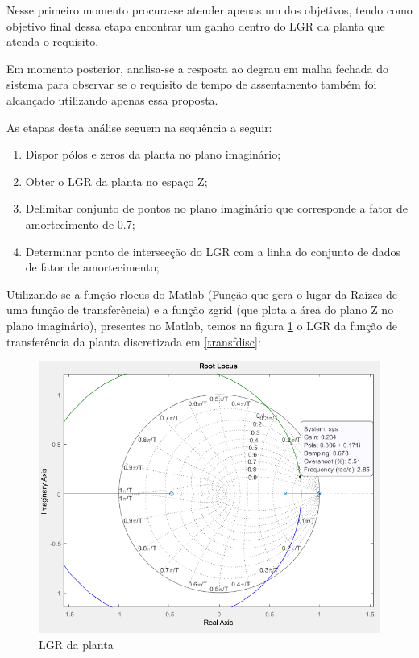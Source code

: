 \documentclass[a4paper,11pt]{article}
\begin{document}
Nesse primeiro momento procura-se atender apenas um dos objetivos, tendo como objetivo final dessa etapa encontrar um ganho dentro do LGR da planta que atenda o requisito. 

Em momento posterior, analisa-se a resposta ao degrau em malha fechada do sistema para observar se o requisito de tempo de assentamento também foi alcançado utilizando apenas essa proposta. 

As etapas desta análise seguem na sequência a seguir:

\begin{enumerate}
   \item Dispor pólos e zeros da planta no plano imaginário;
   \item Obter o LGR da planta no espaço Z;
   \item Delimitar conjunto de pontos no plano imaginário que corresponde a fator de amortecimento de 0.7;
   \item Determinar ponto de intersecção do LGR com a linha do conjunto de dados de fator de amortecimento;
 \end{enumerate}

Utilizando-se a função rlocus do Matlab (Função que gera o lugar da Raízes de uma função de transferência) e a função zgrid (que plota a área do plano Z no plano imaginário), presentes no Matlab, temos na figura \ref{fig:lgr} o LGR da função de transferência da planta discretizada em \ref{transfdisc}:

\begin{figure}[H]
    \centering
    \includegraphics[width=\linewidth]{src/tex/img/rlocus.PNG}
    \caption{LGR da planta}
    \label{fig:lgr}
\end{figure}
\end{document}
